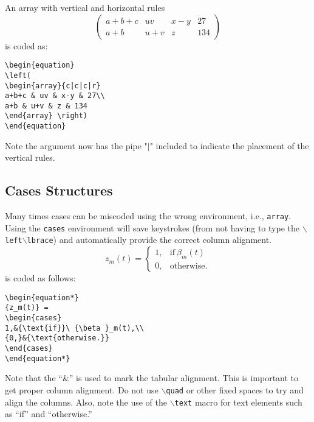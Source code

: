 \documentclass[lettersize,journal]{IEEEtran}
\begin{document}
    An array with vertical and horizontal rules
    \begin{equation}
        \left( \begin{array}{c|c|c|r}
                   a+b+c & uv & x-y & 27\\ \hline
                   a+b & u+v & z & 134
        \end{array}\right)
    \end{equation}
    is coded as:
    \begin{verbatim}
\begin{equation}
\left(
\begin{array}{c|c|c|r}
a+b+c & uv & x-y & 27\\
a+b & u+v & z & 134
\end{array} \right)
\end{equation}
    \end{verbatim}
    Note the argument now has the pipe "$\vert$" included to indicate the placement of the vertical rules.


    \subsection{Cases Structures}
    Many times cases can be miscoded using the wrong environment, i.e., {\tt{array}}. Using the {\tt{cases}} environment will save keystrokes (from not having to type the $\backslash${\tt{left}}$\backslash${\tt{lbrace}}) and automatically provide the correct column alignment.
    \begin{equation*}
    {z_m(t)} = \begin{cases}
                   1,&{\text{if}}\ {\beta }_m(t) \\
                   {0,}&{\text{otherwise.}}
    \end{cases}
    \end{equation*}
    \noindent is coded as follows:
    \begin{verbatim}
\begin{equation*}
{z_m(t)} =
\begin{cases}
1,&{\text{if}}\ {\beta }_m(t),\\
{0,}&{\text{otherwise.}}
\end{cases}
\end{equation*}
    \end{verbatim}
    \noindent Note that the ``\&'' is used to mark the tabular alignment. This is important to get  proper column alignment. Do not use $\backslash${\tt{quad}} or other fixed spaces to try and align the columns. Also, note the use of the $\backslash${\tt{text}} macro for text elements such as ``if'' and ``otherwise.''
\end{document}
